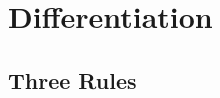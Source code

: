 \documentclass[french]{article}
\begin{document}
\section{Differentiation}

\subsection{Three Rules}
\end{document}
